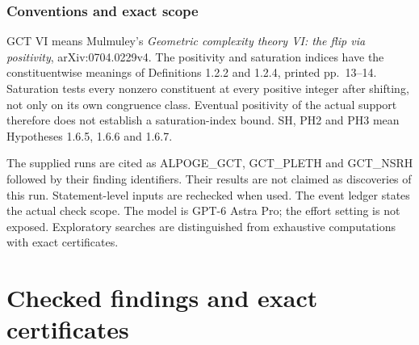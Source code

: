 \documentclass[11pt]{article}
\theoremstyle{definition}\newtheorem{definition}[theorem]{Definition}
\theoremstyle{remark}\newtheorem{remark}[theorem]{Remark}
\begin{document}
\section{Conventions and exact scope}
GCT VI means Mulmuley's \emph{Geometric complexity theory VI: the flip
via positivity}, arXiv:0704.0229v4. The positivity and saturation indices
have the constituentwise meanings of Definitions 1.2.2 and 1.2.4,
printed pp.~13--14. Saturation tests every nonzero constituent at every
positive integer after shifting, not only on its own congruence class.
Eventual positivity of the actual support therefore does not establish
a saturation-index bound. SH, PH2 and PH3 mean Hypotheses 1.6.5,
1.6.6 and 1.6.7.

The supplied runs are cited as ALPOGE\_GCT, GCT\_PLETH and
GCT\_NSRH followed by their finding identifiers. Their results are not
claimed as discoveries of this run. Statement-level inputs are rechecked
when used. The event ledger states the actual check scope. The model is
GPT-6 Astra Pro; the effort setting is not exposed. Exploratory searches
are distinguished from exhaustive computations with exact certificates.

\part{Checked findings and exact certificates}































\end{document}
